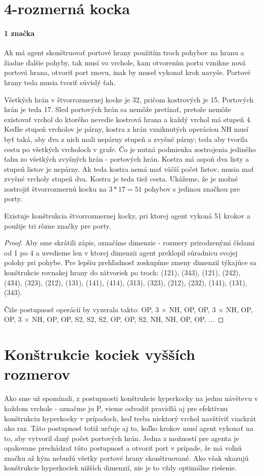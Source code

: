 \section{4-rozmerná kocka}
\paragraph{1 značka}
Ak má agent skonštruovať portové hrany použitím troch pohybov na hranu 
a žiadne
ďalšie pohyby, tak musí vo vrchole, kam otvorením portu vznikne nová
portová hrana, otvoriť port znovu, inak by musel vykonať krok navyše.
Portové hrany teda musia tvoriť súvislý ťah. 

Všetkých hrán v štvorrozmernej kocke je 32, pričom kostrových je 15.
Portových hrán je teda 17. Sled portových hrán sa nemôže pretínať, pretože
nemôže existovať vrchol do ktorého nevedie kostrová hrana a každý vrchol má
stupeň 4. Keďže stupeň vrcholov je párny, kostra z hrán vzniknutých
operáciou NH musí byť taká, aby
dva z nich mali nepárny stupeň a zvyšné párny; teda aby tvorila cestu po
všetkých vrcholoch v grafe. Čo je nutná podmienka zostrojenia
jediného ťahu zo všetkých zvyšných hrán - portových hrán. 
Kostra má aspoň dva listy a stupeň listov je nepárny. 
Ak teda kostra nemá mať väčší počet listov, musia mať
zvyšné vrcholy stupeň dva. Kostra je teda tiež cesta. Ukážeme, že je možné
zostrojiť štvorrozmernú kocku na $3 * 17 = 51$ pohybov s jedinou značkou pre
porty. 
\begin{veta}
Existuje konštrukcia štvorrozmernej kocky, pri ktorej agent vykoná 51 krokov
a použije tri rôzne značky pre porty.
\end{veta}
\begin{proof}
Aby sme skrátili zápis, označíme dimenzie - rozmery prirodzenými číslami od 1 po 4 a
uvedieme len v ktorej dimenzii agent preklopil súradnicu svojej polohy pri
pohybe. Pre lepšiu prehľadnosť zoskupíme zmeny dimenzií týkajúce sa konštrukcie
rovnakej hrany do zátvoriek po troch: (121), (343), (121), (242), (434),
(323), (212), (131), (141), (414), (313), (323), (212), (232), (141), (131),
(343).

Čiže postupnosť operácií by vyzerala takto: OP, 3 $\times$ NH, OP, OP, 3 $\times$
NH, OP, OP, 3 $\times$ NH, OP, OP, S2, S2, S2, OP, OP, S2, NH, NH, OP, OP,
...
\end{proof}

\section{Konštrukcie kociek vyšších rozmerov}
Ako sme už spomínali, z postupnosti konštrukcie hyperkocky na jednu návštevu
v každom vrchole - označme ju P, vieme odvodiť pravidlá aj pre efektívnu konštrukciu
hyperkocky v prípadoch, keď treba niektorý vrchol navštíviť viackrát ako
raz. Táto postupnosť totiž určuje aj to, koľko krokov musí agent vykonať na
to, aby vytvoril daný počet portových hrán. Jedna z možností pre agenta je
opakovane prechádzať túto postupnosť a otvoriť port v prípade, že má voľnú
značku až kým nebudú všetky portové hrany skonštruované. Ako však ukazujú
konštrukcie hyperkociek nižších dimenzií, nie  je to vždy optimálne
riešenie.

